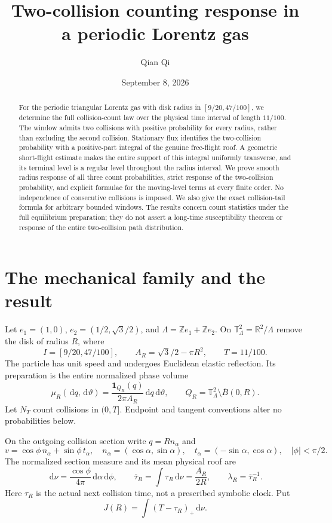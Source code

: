 \documentclass[11pt,reqno]{amsart}
\title[Two-collision counting response]{Two-collision counting response in a periodic Lorentz gas}
\author{Qian Qi}
\date{September 8, 2026}
\numberwithin{equation}{section}
\theoremstyle{remark}\newtheorem{remark}[theorem]{Remark}
\newcommand{\R}{\mathbb R}\newcommand{\Z}{\mathbb Z}\newcommand{\E}{\mathbb E}
\newcommand{\dd}{\,\mathrm d}\newcommand{\one}{\mathbf1}\newcommand{\T}{\mathbb T}
\begin{document}
\begin{abstract}
For the periodic triangular Lorentz gas with disk radius in $[9/20,47/100]$, we determine the full collision-count law over the physical time interval of length $11/100$. The window admits two collisions with positive probability for every radius, rather than excluding the second collision. Stationary flux identifies the two-collision probability with a positive-part integral of the genuine free-flight roof. A geometric short-flight estimate makes the entire support of this integral uniformly transverse, and its terminal level is a regular level throughout the radius interval. We prove smooth radius response of all three count probabilities, strict response of the two-collision probability, and explicit formulae for the moving-level terms at every finite order. No independence of consecutive collisions is imposed. We also give the exact collision-tail formula for arbitrary bounded windows. The results concern count statistics under the full equilibrium preparation; they do not assert a long-time susceptibility theorem or response of the entire two-collision path distribution.
\end{abstract}
\maketitle

\section{The mechanical family and the result}
Let $e_1=(1,0)$, $e_2=(1/2,\sqrt3/2)$, and $\Lambda=\Z e_1+\Z e_2$. On $\T^2_\Lambda=\R^2/\Lambda$ remove the disk of radius $R$, where
\begin{equation}\label{eq:interval}
 I=[9/20,47/100],\qquad A_R=\sqrt3/2-\pi R^2,\qquad T=11/100.
\end{equation}
The particle has unit speed and undergoes Euclidean elastic reflection. Its preparation is the entire normalized phase volume
\[
 \mu_R(\dd q,\dd\vartheta)=\frac{\one_{Q_R}(q)}{2\pi A_R}\dd q\dd\vartheta,
 \qquad Q_R=\T^2_\Lambda\setminus\overline B(0,R).
\]
Let $N_T$ count collisions in $(0,T]$. Endpoint and tangent conventions alter no probabilities below.

On the outgoing collision section write $q=R n_\alpha$ and
\[
 v=\cos\phi\,n_\alpha+\sin\phi\,t_\alpha,
 \quad n_\alpha=(\cos\alpha,\sin\alpha),\quad
 t_\alpha=(-\sin\alpha,\cos\alpha),\quad |\phi|<\pi/2.
\]
The normalized section measure and its mean physical roof are
\begin{equation}\label{eq:flux}
 \dd\nu=\frac{\cos\phi}{4\pi}\dd\alpha\dd\phi,
 \qquad \overline\tau_R=\int\tau_R\dd\nu=\frac{A_R}{2R},
 \qquad \lambda_R=\overline\tau_R^{-1}.
\end{equation}
Here $\tau_R$ is the actual next collision time, not a prescribed symbolic clock. Put
\begin{equation}\label{eq:A}
 J(R)=\int(T-\tau_R)_+\dd\nu.
\end{equation}
\end{document}
